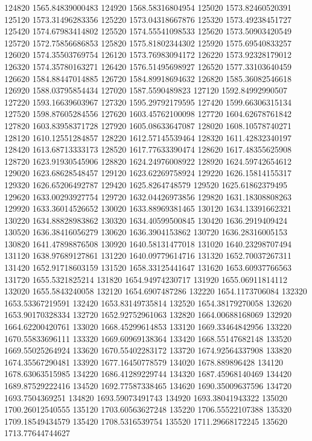 {124820 1565.84839000483
124920 1568.58316804954
125020 1573.82460520391
125120 1573.31496283356
125220 1573.04318667876
125320 1573.49238451727
125420 1574.67983414802
125520 1574.55541098533
125620 1573.50903420549
125720 1572.75856686853
125820 1575.81802344302
125920 1575.69540833257
126020 1574.35503769754
126120 1573.76983094172
126220 1573.92328179012
126320 1574.35780163271
126420 1576.51495698927
126520 1577.33103640459
126620 1584.88447014885
126720 1584.89918694632
126820 1585.36082546618
126920 1588.03795854434
127020 1587.5590489823
127120 1592.84992990507
127220 1593.16639603967
127320 1595.29792179595
127420 1599.66306315134
127520 1598.87605284556
127620 1603.45762100098
127720 1604.62678761842
127820 1603.83958371728
127920 1605.08633647087
128020 1608.10578740271
128120 1610.12551284857
128220 1612.57145539464
128320 1611.42832340197
128420 1613.68713333173
128520 1617.77633390474
128620 1617.48355625908
128720 1623.91930545906
128820 1624.24976008922
128920 1624.59742654612
129020 1623.68628548457
129120 1623.62269758924
129220 1626.15814155317
129320 1626.65206492787
129420 1625.8264748579
129520 1625.61862379495
129620 1633.00293927754
129720 1632.04426973856
129820 1631.18308808263
129920 1633.36014526652
130020 1633.88969381465
130120 1634.13391662321
130220 1634.88828983862
130320 1634.40599500845
130420 1636.2919409424
130520 1636.38416056279
130620 1636.3904153862
130720 1636.28316005153
130820 1641.47898876508
130920 1640.58131477018
131020 1640.23298707494
131120 1638.97689127861
131220 1640.09779614716
131320 1652.70037267311
131420 1652.91718603159
131520 1658.33125441647
131620 1653.60937766563
131720 1655.5321825214
131820 1654.94974230717
131920 1655.06911814112
132020 1655.5843240058
132120 1654.6907487286
132220 1654.1173706084
132320 1653.53367219591
132420 1653.83149735814
132520 1654.38179270058
132620 1653.90170328334
132720 1652.92752961063
132820 1664.00688168069
132920 1664.62200420761
133020 1668.45299614853
133120 1669.33464842956
133220 1670.55833696111
133320 1669.60969138364
133420 1668.55147682148
133520 1669.55025264924
133620 1670.55402283172
133720 1674.92564337908
133820 1674.35567290481
133920 1677.16450778579
134020 1678.889896428
134120 1678.63063515985
134220 1686.41289229744
134320 1687.45968140469
134420 1689.87529222416
134520 1692.77587338465
134620 1690.35009637596
134720 1693.7504369251
134820 1693.59073491743
134920 1693.38041943322
135020 1700.26012540555
135120 1703.60563627248
135220 1706.55522107388
135320 1709.18549434579
135420 1708.5316539754
135520 1711.29668172245
135620 1713.77644744627
}
